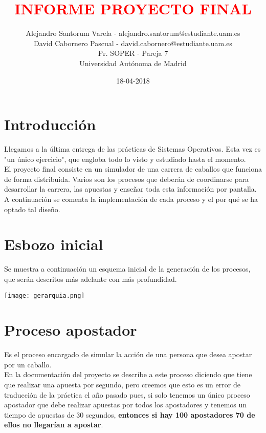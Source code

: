 \documentclass[12pt]{article}
\begin{document}
	\date{18-04-2018}
	
	
	\title{\textbf{\textcolor{red}{INFORME PROYECTO FINAL}}}
	\author{Alejandro Santorum Varela - alejandro.santorum@estudiante.uam.es\\David Cabornero Pascual - david.cabornero@estudiante.uam.es\\Pr. SOPER - Pareja 7\\Universidad Autónoma de Madrid}
	\maketitle
	
	\tableofcontents
	
	\newpage
	
\section{Introducción}
Llegamos a la última entrega de las prácticas de Sistemas Operativos. Esta vez es "un único ejercicio", que engloba todo lo visto y estudiado hasta el momento.\\

El proyecto final consiste en un simulador de una carrera de caballos que funciona de forma distribuida. Varios son los procesos que deberán de coordinarse para desarrollar la carrera, las apuestas y enseñar toda esta información por pantalla.\\

A continuación se comenta la implementación de cada proceso y el por qué se ha optado tal diseño.\\

\section{Esbozo inicial}
Se muestra a continuación un esquema inicial de la generación de los procesos, que serán descritos más adelante con más profundidad.
\begin{center}
	\texttt{[image: gerarquia.png]}
\end{center}

\section{Proceso apostador}
Es el proceso encargado de simular la acción de una persona que desea apostar por un caballo.\\

En la documentación del proyecto se describe a este proceso diciendo que tiene que realizar una apuesta por segundo, pero creemos que esto es un error de traducción de la práctica el año pasado pues, si solo tenemos un único proceso apostador que debe realizar apuestas por todos los apostadores y tenemos un tiempo de apuestas de 30 segundos, \textbf{entonces si hay 100 apostadores 70 de ellos no llegarían a apostar}.\\
\end{document}
